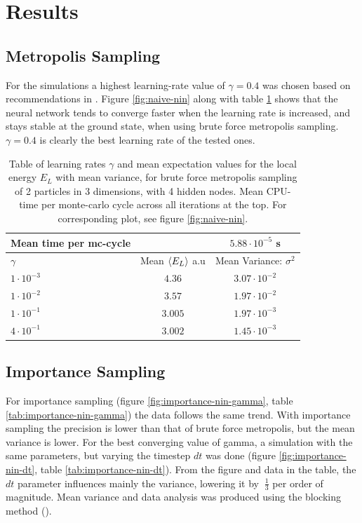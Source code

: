 \section{Results}
\subsection{Metropolis Sampling}
For the simulations a highest learning-rate value of $\gamma = 0.4$ was chosen based on recommendations in \cite{Marsland}.
Figure \ref{fig:naive-nin} along with table \ref{tab:naive-nin} shows that the neural network tends to converge faster when the learning rate is increased,
and stays stable at the ground state, when using brute force metropolis sampling. $\gamma = 0.4$ is clearly the best learning rate of the tested ones.
\begin{table}[h]
\begin{tabular}{l c c}
	Mean time per mc-cycle & &$5.88\cdot10^{-5}$ s \\
	\hline
	$\gamma$ & Mean $\langle E_L \rangle$ a.u & Mean Variance: $\sigma^2$\\
	\hline
	$1\cdot10^{-3}$ & $4.36$ & $3.07\cdot10^{-2}$ \\
	$1\cdot10^{-2}$ & $3.57$ & $1.97\cdot10^{-2}$ \\
	$1\cdot10^{-1}$ & $3.005$ & $1.97\cdot10^{-3}$ \\
	$4\cdot10^{-1}$ & $3.002$ & $1.45\cdot10^{-3}$ \\
\end{tabular}
\caption{Table of learning rates $\gamma$ and mean expectation values for the local energy $E_L$ with mean variance, for brute force metropolis sampling
		of 2 particles in 3 dimensions, with 4 hidden nodes.
		Mean CPU-time per monte-carlo cycle across all iterations at the top.
	For corresponding plot, see figure \ref{fig:naive-nin}.}
\label{tab:naive-nin}
\end{table}

\subsection{Importance Sampling}
For importance sampling (figure \ref{fig:importance-nin-gamma}, table \ref{tab:importance-nin-gamma})
the data follows the same trend. With importance sampling the precision is lower than that of brute
force metropolis, but the mean variance is lower.
For the best converging value of gamma, a simulation with the same parameters, but varying the
timestep $dt$ was done (figure \ref{fig:importance-nin-dt}, table \ref{tab:importance-nin-dt}).
From the figure and data in the table, the $dt$ parameter influences mainly the variance,
lowering it by $~\frac{1}{3}$ per order of magnitude.
Mean variance and data analysis was produced using the blocking method (\cite{Lectures-blocking}).

